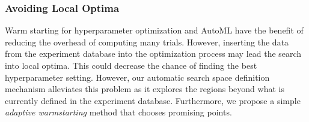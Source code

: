 \subsubsection{Avoiding Local Optima}
Warm starting for hyperparameter optimization and AutoML have the benefit of reducing the overhead of computing many trials.
However, inserting the data from the experiment database into the optimization process may lead the search into local optima.
This could decrease the chance of finding the best hyperparameter setting.
However, our automatic search space definition mechanism alleviates this problem as it explores the regions beyond what is currently defined in the experiment database.
Furthermore, we propose a simple \textit{adaptive warmstarting} method that chooses promising points.




